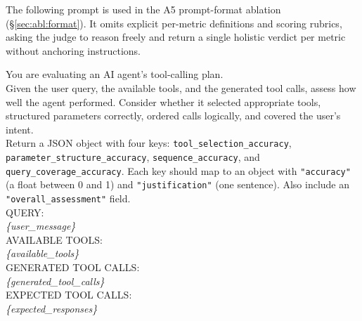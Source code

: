 The following prompt is used in the A5 prompt-format ablation (\S\ref{sec:abl:format}). It omits explicit per-metric definitions and scoring rubrics, asking the judge to reason freely and return a single holistic verdict per metric without anchoring instructions.

\begin{promptbox}
\ttfamily\small
You are evaluating an AI agent's tool-calling plan.\\[4pt]
Given the user query, the available tools, and the generated tool calls, assess how well the agent performed. Consider whether it selected appropriate tools, structured parameters correctly, ordered calls logically, and covered the user's intent.\\[4pt]
Return a JSON object with four keys: \texttt{tool\_selection\_accuracy}, \texttt{parameter\_structure\_accuracy}, \texttt{sequence\_accuracy}, and \texttt{query\_coverage\_accuracy}. Each key should map to an object with \texttt{"accuracy"} (a float between 0 and 1) and \texttt{"justification"} (one sentence). Also include an \texttt{"overall\_assessment"} field.\\[6pt]
QUERY:\\
\textit{\{user\_message\}}\\[4pt]
AVAILABLE TOOLS:\\
\textit{\{available\_tools\}}\\[4pt]
GENERATED TOOL CALLS:\\
\textit{\{generated\_tool\_calls\}}\\[4pt]
EXPECTED TOOL CALLS:\\
\textit{\{expected\_responses\}}
\end{promptbox}
